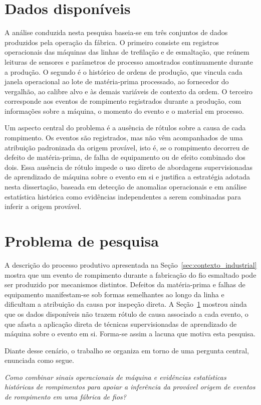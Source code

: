 \section{Dados disponíveis}
\label{sec:dados_disponiveis}

A análise conduzida nesta pesquisa baseia-se em três conjuntos de dados produzidos pela operação da fábrica. O primeiro consiste em registros operacionais das máquinas das linhas de trefilação e de esmaltação, que reúnem leituras de sensores e parâmetros de processo amostrados continuamente durante a produção. O segundo é o histórico de ordens de produção, que vincula cada janela operacional ao lote de matéria-prima processado, ao fornecedor do vergalhão, ao calibre alvo e às demais variáveis de contexto da ordem. O terceiro corresponde aos eventos de rompimento registrados durante a produção, com informações sobre a máquina, o momento do evento e o material em processo.

Um aspecto central do problema é a ausência de rótulos sobre a causa de cada rompimento. Os eventos são registrados, mas não vêm acompanhados de uma atribuição padronizada da origem provável, isto é, se o rompimento decorreu de defeito de matéria-prima, de falha de equipamento ou de efeito combinado dos dois. Essa ausência de rótulo impede o uso direto de abordagens supervisionadas de aprendizado de máquina sobre o evento em si e justifica a estratégia adotada nesta dissertação, baseada em detecção de anomalias operacionais e em análise estatística histórica como evidências independentes a serem combinadas para inferir a origem provável.


\section{Problema de pesquisa}
\label{sec:problema_pesquisa}

A descrição do processo produtivo apresentada na Seção~\ref{sec:contexto_industrial} mostra que um evento de rompimento durante a fabricação do fio esmaltado pode ser produzido por mecanismos distintos. Defeitos da matéria-prima e falhas de equipamento manifestam-se sob formas semelhantes ao longo da linha e dificultam a atribuição da causa por inspeção direta. A Seção~\ref{sec:dados_disponiveis} mostrou ainda que os dados disponíveis não trazem rótulo de causa associado a cada evento, o que afasta a aplicação direta de técnicas supervisionadas de aprendizado de máquina sobre o evento em si. Forma-se assim a lacuna que motiva esta pesquisa.

Diante desse cenário, o trabalho se organiza em torno de uma pergunta central, enunciada como segue.

\begin{center}
    \emph{Como combinar sinais operacionais de máquina e evidências estatísticas históricas de rompimentos para apoiar a inferência da provável origem de eventos de rompimento em uma fábrica de fios?}
\end{center}

